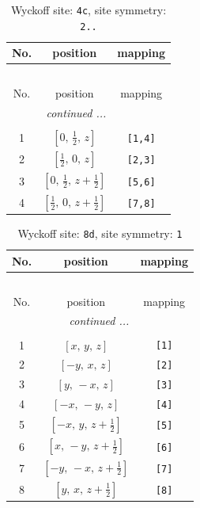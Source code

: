 \documentclass[fleqn,8pt]{jsarticle}
\begin{document}
\renewcommand{\arraystretch}{1.2}
\begin{longtable}{ccc}
\caption{Wyckoff site: {\tt 4c}, site symmetry: {\tt 2..}}
 \\
 \hline \hline
No. & position & mapping \\ \hline \endfirsthead

\multicolumn{2}{l}{\tablename\ \thetable{}} \\
 \hline \hline
No. & position & mapping \\ \hline \endhead

 \hline \hline
\multicolumn{2}{r}{\footnotesize\it continued ...} \\ \endfoot

 \hline \hline
\multicolumn{2}{r}{} \\ \endlastfoot

1 & $\left[ 0,\, \frac{1}{2},\, z \right]$ & {\tt [1,4]} \\ \hline
2 & $\left[ \frac{1}{2},\, 0,\, z \right]$ & {\tt [2,3]} \\ \hline
3 & $\left[ 0,\, \frac{1}{2},\, z + \frac{1}{2} \right]$ & {\tt [5,6]} \\ \hline
4 & $\left[ \frac{1}{2},\, 0,\, z + \frac{1}{2} \right]$ & {\tt [7,8]} \\
\end{longtable}
\renewcommand{\arraystretch}{1.2}
\begin{longtable}{ccc}
\caption{Wyckoff site: {\tt 8d}, site symmetry: {\tt 1}}
 \\
 \hline \hline
No. & position & mapping \\ \hline \endfirsthead

\multicolumn{2}{l}{\tablename\ \thetable{}} \\
 \hline \hline
No. & position & mapping \\ \hline \endhead

 \hline \hline
\multicolumn{2}{r}{\footnotesize\it continued ...} \\ \endfoot

 \hline \hline
\multicolumn{2}{r}{} \\ \endlastfoot

1 & $\left[ x,\, y,\, z \right]$ & {\tt [1]} \\ \hline
2 & $\left[ - y,\, x,\, z \right]$ & {\tt [2]} \\ \hline
3 & $\left[ y,\, - x,\, z \right]$ & {\tt [3]} \\ \hline
4 & $\left[ - x,\, - y,\, z \right]$ & {\tt [4]} \\ \hline
5 & $\left[ - x,\, y,\, z + \frac{1}{2} \right]$ & {\tt [5]} \\ \hline
6 & $\left[ x,\, - y,\, z + \frac{1}{2} \right]$ & {\tt [6]} \\ \hline
7 & $\left[ - y,\, - x,\, z + \frac{1}{2} \right]$ & {\tt [7]} \\ \hline
8 & $\left[ y,\, x,\, z + \frac{1}{2} \right]$ & {\tt [8]} \\
\end{longtable}
\end{document}
